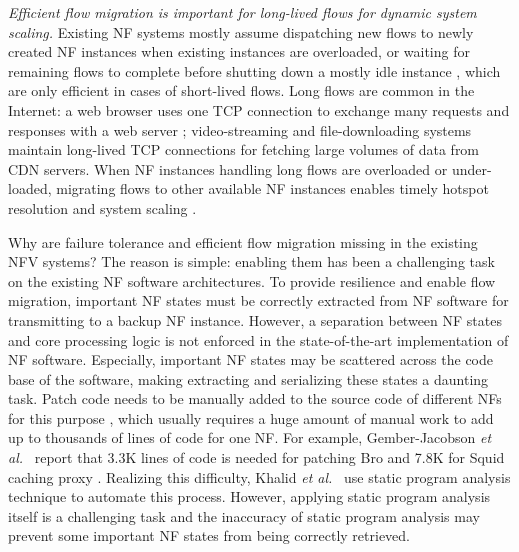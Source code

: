 {\em Efficient flow migration is important for long-lived flows for dynamic system scaling.} Existing NF systems mostly assume dispatching new flows to newly created NF instances when existing instances are overloaded, or waiting for remaining flows to complete before shutting down a mostly idle instance , which are only efficient in cases of short-lived flows. Long flows are common in the Internet: %
a web browser uses one TCP connection to exchange many requests and responses with a
web server \cite{http-keep-alive}; video-streaming
\cite{ffmpeg} and file-downloading \cite{ftp} systems maintain long-lived TCP
connections for fetching large volumes of data from CDN servers. %
 When NF instances handling long flows are overloaded or under-loaded, migrating flows to other available NF instances enables timely hotspot resolution and system scaling \cite{gember2015opennf}. %


Why are failure tolerance and efficient flow migration missing in the existing NFV systems? The reason is simple: enabling them %
 has been a challenging task on the existing NF software architectures. To provide resilience and enable flow migration, important NF states must be correctly extracted from NF software for transmitting to a backup NF instance. %
 However, a separation between NF states and core processing logic is not enforced in the state-of-the-art implementation of NF software. Especially, important NF states may be scattered across the code base of the software, making
extracting and serializing these states a daunting task. Patch code needs to be
manually added to the source code of different NFs for this purpose %
 \cite{gember2015opennf}\cite{rajagopalan2013split}, which usually requires a huge amount of manual work to add up to
thousands of lines of code for one NF. For example, Gember-Jacobson {\em et al.}~\cite{gember2015opennf} report
that 3.3K lines of code is needed for patching Bro \cite{bro} and 7.8K for Squid caching
proxy \cite{squid}.  Realizing this difficulty, Khalid {\em et al.}~\cite{khalid2016paving} use
static program analysis technique to automate this process. However, applying
static program analysis itself is a challenging task and the inaccuracy of
static program analysis may prevent some important NF states from being
correctly retrieved.

